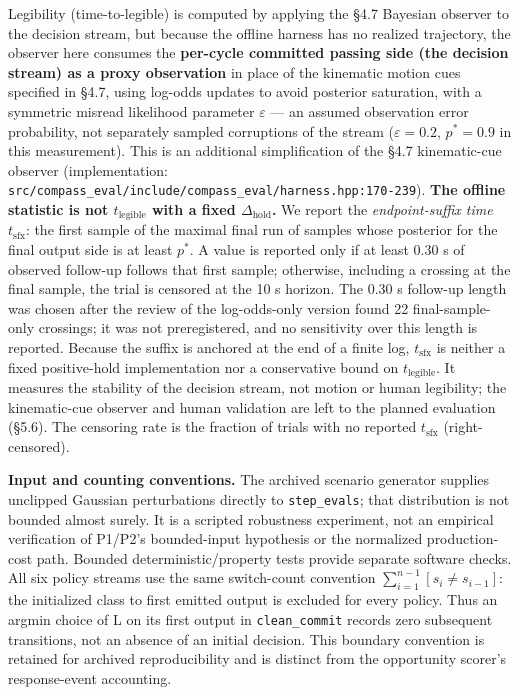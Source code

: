 \documentclass[11pt]{article}
\newcommand{\code}[1]{\texttt{#1}}
\begin{document}
Legibility (time-to-legible) is computed by applying the \S4.7 Bayesian observer to the decision stream, but because the offline harness has no realized trajectory, the observer here consumes the \textbf{per-cycle committed passing side (the decision stream) as a proxy observation} in place of the kinematic motion cues specified in \S4.7, using log-odds updates to avoid posterior saturation, with a symmetric misread likelihood parameter $\varepsilon$ --- an assumed observation error probability, not separately sampled corruptions of the stream ($\varepsilon = 0.2$, $p^* = 0.9$ in this measurement). This is an additional simplification of the \S4.7 kinematic-cue observer (implementation: \code{src/compass\_eval/include/compass\_eval/harness.hpp:170-239}). \textbf{The offline statistic is not $t_{\text{legible}}$ with a fixed $\Delta_{\text{hold}}$.} We report the \emph{endpoint-suffix time} $t_{\text{sfx}}$: the first sample of the maximal final run of samples whose posterior for the final output side is at least $p^*$. A value is reported only if at least 0.30 s of observed follow-up follows that first sample; otherwise, including a crossing at the final sample, the trial is censored at the 10 s horizon. The 0.30 s follow-up length was chosen after the review of the log-odds-only version found 22 final-sample-only crossings; it was not preregistered, and no sensitivity over this length is reported. Because the suffix is anchored at the end of a finite log, $t_{\text{sfx}}$ is neither a fixed positive-hold implementation nor a conservative bound on $t_{\text{legible}}$. It measures the stability of the decision stream, not motion or human legibility; the kinematic-cue observer and human validation are left to the planned evaluation (\S5.6). The censoring rate is the fraction of trials with no reported $t_{\text{sfx}}$ (right-censored).

\FloatBarrier
\textbf{Input and counting conventions.} The archived scenario generator supplies unclipped Gaussian perturbations directly to \code{step\_evals}; that distribution is not bounded almost surely. It is a scripted robustness experiment, not an empirical verification of P1/P2's bounded-input hypothesis or the normalized production-cost path. Bounded deterministic/property tests provide separate software checks. All six policy streams use the same switch-count convention $\sum_{i=1}^{n-1}[s_i\ne s_{i-1}]$: the initialized class to first emitted output is excluded for every policy. Thus an argmin choice of L on its first output in \code{clean\_commit} records zero subsequent transitions, not an absence of an initial decision. This boundary convention is retained for archived reproducibility and is distinct from the opportunity scorer's response-event accounting.
\end{document}
